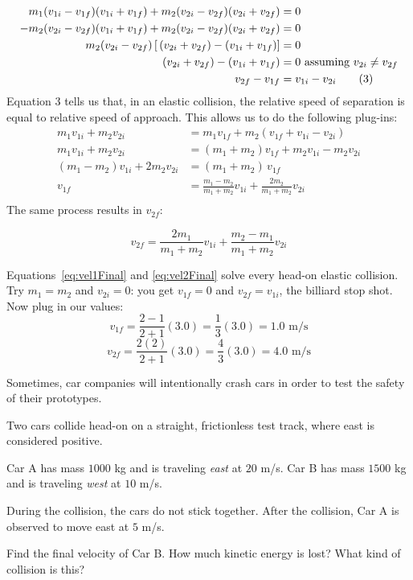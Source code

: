 \begin{Answer}[ref=carts_elastic]
\begin{align*}
m_1 (v_{1i} - v_{1f})(v_{1i} + v_{1f})+m_2 (v_{2i} - v_{2f})(v_{2i} + v_{2f}) &= 0 \\
- m_2 (v_{2i} - v_{2f})(v_{1i} + v_{1f})+m_2 (v_{2i} - v_{2f})(v_{2i} + v_{2f}) &= 0 \\ 
m_2 (v_{2i} - v_{2f})\left[\, (v_{2i} + v_{2f}) - (v_{1i} + v_{1f}) \right] &= 0 \\ 
(v_{2i} + v_{2f}) - (v_{1i} + v_{1f}) &= 0 \hfill \text{ assuming } v_{2i} \ne v_{2f}\\
v_{2f} - v_{1f} &= v_{1i} - v_{2i} \tag{3}\\ 
\end{align*}
Equation 3 tells us that, in an elastic collision, the relative speed of separation is equal to relative speed of approach. 
This allows us to do the following plug-ins:
\begin{align*}
m_1 v_{1i} + m_2 v_{2i}&=m_1 v_{1f}+m_2 (v_{1f} + v_{1i} - v_{2i}) \\ 
m_1 v_{1i} + m_2 v_{2i}&=(m_1 + m_2) v_{1f} + m_2 v_{1i} - m_2 v_{2i} \\
(m_1 - m_2) v_{1i} + 2 m_2 v_{2i}&=(m_1 + m_2)\, v_{1f} \\ 
v_{1f}&=\frac{m_1 - m_2}{m_1 + m_2} v_{1i}+\frac{2m_2}{m_1 + m_2} v_{2i} \tag{4}\label{eq:vel1Final}\\
\end{align*}
The same process results in $v_{2f}$:

\begin{equation}
  v_{2f} =\frac{2m_1}{m_1 + m_2} v_{1i}+\frac{m_2 - m_1}{m_1 + m_2} v_{2i}\tag{5}\label{eq:vel2Final}
\end{equation}

Equations~\eqref{eq:vel1Final} and \eqref{eq:vel2Final} solve every
head-on elastic collision. Try $m_1 = m_2$ and $v_{2i} = 0$: you get
$v_{1f} = 0$ and $v_{2f} = v_{1i}$, the billiard stop shot. Now plug in our
values:
$$v_{1f} = \frac{2 - 1}{2 + 1}(3.0)
= \frac{1}{3}(3.0)
= 1.0\text{ m/s}$$
$$v_{2f} = \frac{2(2)}{2+1}(3.0)
= \frac{4}{3}(3.0)
= 4.0\text{ m/s}$$
\end{Answer}

\begin{Exercise}[title={Car Crash}, label={car_crash}]
Sometimes, car companies will intentionally crash cars in order to test the safety of their prototypes.

Two cars collide head-on on a straight, frictionless test track, where east is considered positive.

Car A has mass $1000$ kg and is traveling \emph{east} at $20$ m/s. Car B has mass $1500$ kg and is traveling \emph{west} at $10$ m/s.

During the collision, the cars do not stick together. After the collision, Car A is observed to move east at $5$ m/s.

Find the final velocity of Car B. How much kinetic energy is lost? What
kind of collision is this?
\end{Exercise}

